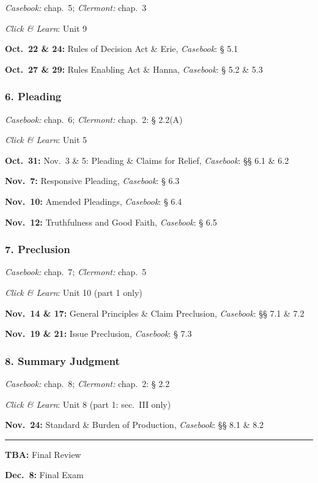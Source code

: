 \documentclass[11pt,letterpaper,twoside]{article}
\begin{document}
\emph{Casebook:} chap.~5; \emph{Clermont:} chap.~3

\emph{Click \& Learn}: Unit 9

\textbf{Oct.~22 \& 24:} Rules of Decision Act \& Erie, \emph{Casebook}:
§ 5.1

\textbf{Oct.~27 \& 29:} Rules Enabling Act \& Hanna, \emph{Casebook}: §
5.2 \& 5.3

\subsubsection{6. Pleading}\label{pleading}

\emph{Casebook:} chap.~6; \emph{Clermont:} chap.~2: § 2.2(A)

\emph{Click \& Learn}: Unit 5

\textbf{Oct.~31:} Nov.~3 \& 5: Pleading \& Claims for Relief,
\emph{Casebook}: §§ 6.1 \& 6.2

\textbf{Nov.~7:} Responsive Pleading, \emph{Casebook}: § 6.3

\textbf{Nov.~10:} Amended Pleadings, \emph{Casebook}: § 6.4

\textbf{Nov.~12:} Truthfulness and Good Faith, \emph{Casebook}: § 6.5

\subsubsection{7. Preclusion}\label{preclusion}

\emph{Casebook:} chap.~7; \emph{Clermont:} chap.~5

\emph{Click \& Learn}: Unit 10 (part 1 only)

\textbf{Nov.~14 \& 17:} General Principles \& Claim Preclusion,
\emph{Casebook}: §§ 7.1 \& 7.2

\textbf{Nov.~19 \& 21:} Issue Preclusion, \emph{Casebook}: § 7.3

\subsubsection{8. Summary Judgment}\label{summary-judgment}

\emph{Casebook:} chap.~8; \emph{Clermont:} chap.~2: § 2.2

\emph{Click \& Learn}: Unit 8 (part 1: sec.~III only)

\textbf{Nov.~24:} Standard \& Burden of Production, \emph{Casebook}: §§
8.1 \& 8.2

\begin{center}\rule{0.5\linewidth}{0.5pt}\end{center}

\textbf{TBA:} Final Review

\textbf{Dec.~8:} Final Exam
\end{document}
